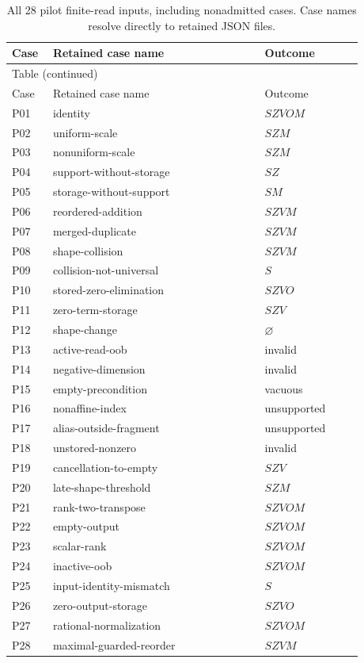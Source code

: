 \begin{longtable}{@{}p{0.09\linewidth}p{0.54\linewidth}p{0.25\linewidth}@{}}
\caption{All 28 pilot finite-read inputs, including nonadmitted cases. Case names resolve directly to retained JSON files.}\label{tab:pilot-catalog}\\
\toprule Case & Retained case name & Outcome\\\midrule\endfirsthead
\multicolumn{3}{l}{Table \thetable{} (continued)}\\
\toprule Case & Retained case name & Outcome\\\midrule\endhead
\bottomrule\endfoot
P01 & identity & $SZVOM$\\
P02 & uniform-scale & $SZM$\\
P03 & nonuniform-scale & $SZM$\\
P04 & support-without-storage & $SZ$\\
P05 & storage-without-support & $SM$\\
P06 & reordered-addition & $SZVM$\\
P07 & merged-duplicate & $SZVM$\\
P08 & shape-collision & $SZVM$\\
P09 & collision-not-universal & $S$\\
P10 & stored-zero-elimination & $SZVO$\\
P11 & zero-term-storage & $SZV$\\
P12 & shape-change & $\varnothing$\\
P13 & active-read-oob & invalid\\
P14 & negative-dimension & invalid\\
P15 & empty-precondition & vacuous\\
P16 & nonaffine-index & unsupported\\
P17 & alias-outside-fragment & unsupported\\
P18 & unstored-nonzero & invalid\\
P19 & cancellation-to-empty & $SZV$\\
P20 & late-shape-threshold & $SZM$\\
P21 & rank-two-transpose & $SZVOM$\\
P22 & empty-output & $SZVOM$\\
P23 & scalar-rank & $SZVOM$\\
P24 & inactive-oob & $SZVOM$\\
P25 & input-identity-mismatch & $S$\\
P26 & zero-output-storage & $SZVO$\\
P27 & rational-normalization & $SZVOM$\\
P28 & maximal-guarded-reorder & $SZVM$\\
\end{longtable}
